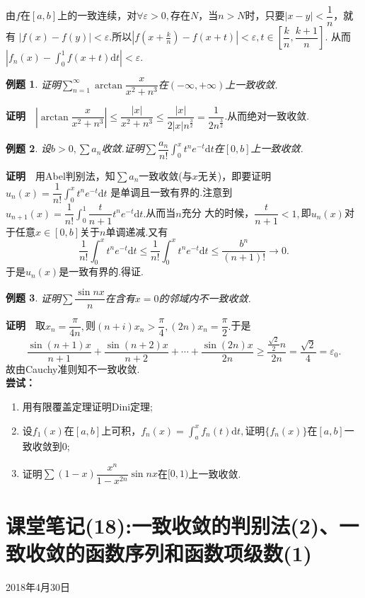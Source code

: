 \documentclass[UTF8]{article}
\newcommand{\zm}{\textbf{证明}$\quad$}
\newtheorem{exa}{\hspace{2em}例题}[section]
\begin{document}
由$f$在$[a,b]$上的一致连续，对$\forall\varepsilon>0,$存在$N$，当$n>N$时，只要$|x-y|<\dfrac{1}{n}$，就有
$|f(x)-f(y)|<\varepsilon.$所以$|f(x+\frac{k}{n})-f(x+t)|<\varepsilon,t\in[\dfrac{k}{n},\dfrac{k+1}{n}]$.
从而$|f_n(x)-\int_0^1f(x+t)\mathrm{d}t|<\varepsilon$.
\begin{exa}
  证明$\sum\limits_{n=1}^\infty \arctan\dfrac{x}{x^2+n^3}$在$(-\infty,+\infty)$上一致收敛.
\end{exa}
\zm $|\arctan\dfrac{x}{x^2+n^3}|\le\dfrac{|x|}{x^2+n^3}\le\dfrac{|x|}{2|x|n^\frac{3}{2}}=
\dfrac{1}{2n^\frac{3}{2}}$.从而绝对一致收敛.
\begin{exa}
  设$b>0,\sum a_n$收敛.证明$\sum\dfrac{a_n}{n!}\int_0^xt^ne^{-t}\mathrm{d}t$在$[0,b]$上一致收敛.
\end{exa}
\zm 用Abel判别法，知$\sum a_n$一致收敛(与$x$无关)，即要证明$u_n(x)=\dfrac{1}{n!}\int_0^xt^ne^{-t}\mathrm{d}t$
是单调且一致有界的.注意到$u_{n+1}(x)=\dfrac{1}{n!}\int_0^1\dfrac{t}{n+1}t^ne^{-t}\mathrm{d}t.$从而当$n$充分
大的时候，$\dfrac{t}{n+1}<1,$即$u_n(x)$对于任意$x\in[0,b]$关于$n$单调递减.又有
$$\frac{1}{n!}\int_0^xt^ne^{-t}\mathrm{d}t\le\frac{1}{n!}\int_0^xt^ne^{-t}\mathrm{d}t\le\frac{b^n}{(n+1)!}\to0.$$
于是$u_n(x)$是一致有界的.得证.
\begin{exa}
  证明$\sum \dfrac{\sin nx}{n}$在含有$x=0$的邻域内不一致收敛.
\end{exa}
\zm 取$x_n=\dfrac{\pi}{4n},$则$(n+i)x_n>\dfrac{\pi}{4},(2n)x_n=\dfrac{\pi}{2}.$于是
$$\frac{\sin(n+1)x}{n+1}+\frac{\sin(n+2)x}{n+2}+\cdots+\frac{\sin(2n)x}{2n}\ge\dfrac{\frac{\sqrt{2}}{2}n}{2n}
=\frac{\sqrt{2}}{4}=\varepsilon_0.$$
故由Cauchy准则知不一致收敛.\\
\textbf{尝试：}
\begin{enumerate}
  \item 用有限覆盖定理证明Dini定理;
  \item 设$f_1(x)$在$[a,b]$上可积，$f_n(x)=\int_a^xf_n(t)\mathrm{d}t,$证明$\{f_n(x)\}$在$[a,b]$一致收敛到0;
  \item 证明$\sum (1-x)\dfrac{x^n}{1-x^{2n}}\sin nx$在$[0,1)$上一致收敛.
\end{enumerate}
\clearpage

\section{课堂笔记(18):一致收敛的判别法(2)、一致收敛的函数序列和函数项级数(1)}
\begin{center}
  2018年4月30日
\end{center}
\end{document}
